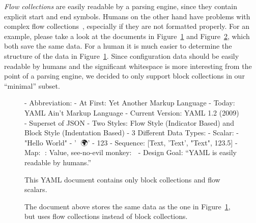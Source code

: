 \emph{Flow collections} are easily readable by a parsing engine, since they contain explicit start and end symbols. Humans on the other hand have problems with complex flow collections~\cite{connor2018flowstyle}, especially if they are not formatted properly. For an example, please take a look at the  documents in Figure~\ref{fig:block_collection} and Figure~\ref{fig:flow_collection}, which both save the same data. For a human it is much easier to determine the structure of the data in Figure~\ref{fig:block_collection}. Since configuration data should be easily readable by humans and the significant whitespace is more interesting from the point of a parsing engine, we decided to only support block collections in our “minimal”  subset.

\begin{figure}
  \begin{yamlcode}
    - Abbreviation:
       - At First: Yet Another Markup Language
       - Today: YAML Ain’t Markup Language
    - Current Version: YAML 1.2 (2009)
    - Superset of JSON
    - Two Styles: Flow Style (Indicator Based) and
                  Block Style (Indentation Based)
    - 3 Different Data Types:
      - Scalar:
        - "Hello World"
        - '👋 🌍'
        - 123
      - Sequence: [Text, 'Text', "Text", 123.5]
      - Map: {🔑: Value, see-no-evil monkey: 🙈}
    - Design Goal: “YAML is easily readable by humans.”
  \end{yamlcode}
  \caption{This \gls{YAML} document contains only block collections and flow scalars.}
  \label{fig:block_collection}
\end{figure}

\begin{figure}
\begin{yamlcode}
\end{yamlcode}
  \caption{The  document above stores the same data as the one in Figure~\ref{fig:block_collection}, but uses flow collections instead of block collections.}
  \label{fig:flow_collection}
\end{figure}

